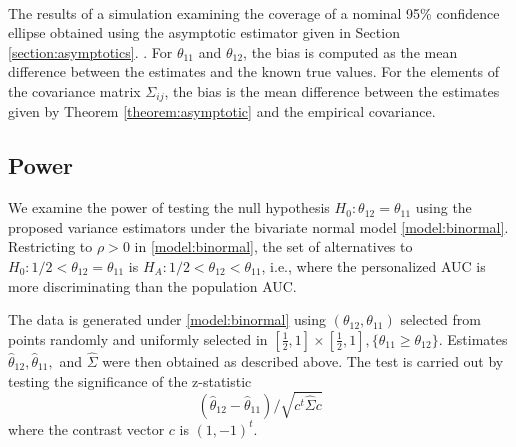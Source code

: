 \documentclass[12pt]{article}
\DeclareMathOperator{\AUC}{AUC}
\newcommand{\cind}{\perp \!\!\! \perp}
\newcommand{\aucindiv}{\theta_{11}}%
\newcommand{\aucpop}{\theta_{12}}%
\newcommand{\aucindivhat}{\hat{\theta}_{11}}%
\newcommand{\aucpophat}{\hat{\theta}_{12}}%
\newcommand{\comment}[1]{
  \iftoggle{commenttoggle}{
    {\normalsize{\color{red}{ #1}}\normalsize}
  }
  {}
}
\begin{document}
\begin{table}
  \\
    \caption{The results of a simulation examining the coverage of a nominal 95\% confidence ellipse obtained using the asymptotic estimator given in Section \ref{section:asymptotics}.\comment{make conssitent order of theta11 vs theta12 columns}. For $\aucindiv$ and $\aucpop$, the bias is computed as the mean difference between the estimates and the known true values. For the elements of the covariance matrix $\Sigma_{ij}$, the bias is the mean difference between the estimates given by Theorem \ref{theorem:asymptotic}   and the empirical covariance.}
    \label{table:1}
\end{table}

%   



\subsection{Power}\label{section:simulation:power}

We examine the power of testing the null hypothesis
$H_0:\aucpop=\aucindiv$ using the proposed variance estimators under
the bivariate normal model \eqref{model:binormal}. Restricting to $\rho>0$ in
\eqref{model:binormal}, the set of alternatives to $H_0:1/2< \aucpop=\aucindiv$ is
 $H_A:1/2<\aucpop<\aucindiv$, i.e., where the
personalized AUC is more discriminating than the population AUC.

The data is generated under \eqref{model:binormal} using
$(\aucpop,\aucindiv)$ selected from points randomly and uniformly selected in
$[\frac{1}{2},1]\times[\frac{1}{2},1], \{\aucindiv\ge\aucpop\}$. Estimates
$\aucpophat,\aucindivhat,$ and $\hat\Sigma$ were then obtained as described
above. The test is carried out by testing the significance of the
z-statistic
$$
(\aucpophat-\aucindivhat) /
\sqrt{c^t\hat\Sigma c}
$$
where the contrast vector $c$ is $(1,-1)^t$.
\end{document}
